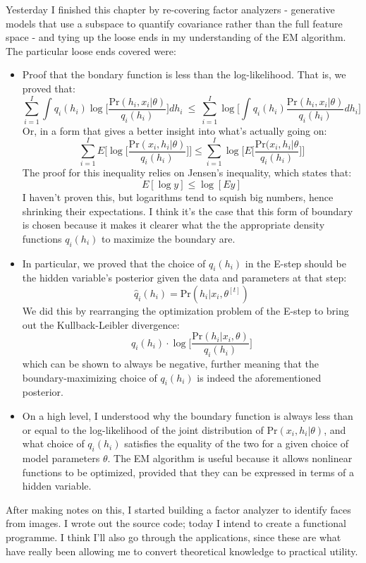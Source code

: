 \documentclass[idxtotoc,hyperref,openany]{labbook} %
\begin{document}
 Yesterday I finished this chapter by re-covering factor analyzers - generative models that use a subspace to quantify covariance rather than the full feature space - and tying up the loose ends in my understanding of the EM algorithm. The particular loose ends covered were:
 \begin{itemize}
 	\item Proof that the bondary function is less than the log-likelihood. That is, we proved that:
 	\[
 		\sum_{i=1}^I \int q_i(h_i) \log\Bigg[\frac{\text{Pr}(h_i, x_i| \theta)}{q_i(h_i)} \Bigg]dh_i \ \leq \ \sum_{i=1}^I \log\Bigg[\int q_i(h_i) \frac{\text{Pr}(h_i, x_i| \theta)}{q_i(h_i)}dh_i \Bigg]
 	\]
 	Or, in a form that gives a better insight into what's actually going on:
 	\[
 		\sum_{i=1}^I E\Bigg[\log\Big[\frac{\text{Pr}(x_i, h_i|\theta)}{q_i(h_i)}\Big]\Bigg] \leq \sum_{i=1}^I \log\Bigg[E\Big[\frac{\text{Pr}(x_i, h_i|\theta}{q_i (h_i)}\Big]\Bigg]
 	\]
 	The proof for this inequality relies on Jensen's inequality, which states that:
 	\[
 		E[\log y] \leq \log[Ey]
 	\]
 	I haven't proven this, but logarithms tend to squish big numbers, hence shrinking their expectations. I think it's the case that this form of boundary is chosen because it makes it clearer what the the appropriate density functions $q_i(h_i)$ to maximize the boundary are.
 	\item In particular, we proved that the choice of $q_i(h_i)$ in the E-step should be the hidden variable's posterior given the data and parameters at that step:
 	\[
 		\hat{q}_i(h_i) = \text{Pr}(h_i | x_i, \theta^{[t]})
 	\]
 	We did this by rearranging the optimization problem of the E-step to bring out the Kullback-Leibler divergence:
 	\[
 		q_i(h_i) \cdot \log\Big[\frac{\text{Pr}(h_i|x_i, \theta)}{q_i(h_i)}\Big]
 	\]
 	which can be shown to always be negative, further meaning that the boundary-maximizing choice of $q_i(h_i)$ is indeed the aforementioned posterior.
 	\item On a high level, I understood why the boundary function is always less than or equal to the log-likelihood of the joint distribution of $\text{Pr}(x_i, h_i|\theta)$, and what choice of $q_i(h_i)$ satisfies the equality of the two for a given choice of model parameters $\theta$. The EM algorithm is useful because it allows nonlinear functions to be optimized, provided that they can be expressed in terms of a hidden variable.
 \end{itemize}
 After making notes on this, I started building a factor analyzer to identify faces from images. I wrote out the source code; today I intend to create a functional programme. I think I'll also go through the applications, since these are what have really been allowing me to convert theoretical knowledge to practical utility.
 
\end{document}
